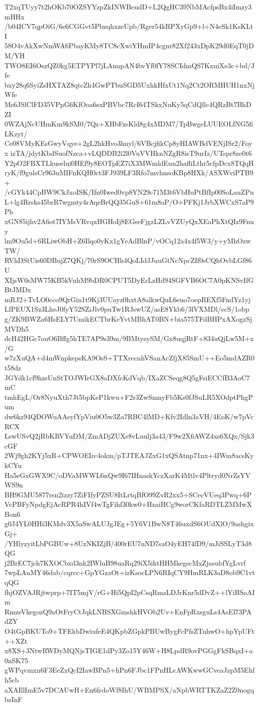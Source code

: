 T2xqTUyy7t2hOKb70OZSYYzpZkINWBeudD+L2QgHC39NbMAcfpsBx4iImzy3mHHx
/b04ICV7qpOiG/6e6CGGvt5PbzqhxzeUpb/Rger54kRPXyGp9+l+N4eSk1KsKLtI
58O4vAkXwNmWA6PbayKMy8TC8cXwiYHmIP4cgnr82Xf243xDpK29d0EqT0jDM/YH
TWO8EI6OszQZ0kg5ETPYPl7jLAnupAN4bvYf0fY78SCIdmQS7KxuiXe3c+bd/Jfe
bxy28q6SyiZsHXTAZ8qtcZh4GwPTbuSGD5UxhkHfxUt1Nq2Ct2ORMHUH1nxNjWfe
Ms6JSlClFD35VPpG6KfOoa6sxPBVbc7RcI64TSkxNuKy5qCdQllc4QRzBt7BhDZI
0WZAjNcUHmKm9kSM0/7Qz+XHbFzsKld8g4xMDM7/TpBwgeLUUEOLfNG5fiLKzyt/
Ce08VMyKEsGwyVqye+2gL2hkHvo3huyl/6VBcjfikCp8yHIAWBdVENjISr2/Foyx
izTA/jdytKbdSuofNzca+vLQDDB2i2l0VuVVHknNZgR8isT9urIz/UTspr8ze0t6
Y2pO2FBXTLkuselui0HEf9y8EOTpEZ7iX3MWmldEun2hafliLthr5cfpDcx8TQqH
ryK/f9gulsCr963uMIFnKQH0ct3FJ939LF3Rfo7mvhnsoKBp8HXk/ASXWviPTB9+
/cGYk44CpBW9CkJxoISK/Ifn0Iwed0vp8YN29c71M3t6VbHuPtBfIp00SoLauZPu
L+lg4Rrsks45brR7wgmty4rAqeBrQQ35GuS+61m8aP/O+PFKj1JrbXWCxS7aP9Ph
xGN85ijhv2A6ot7IYMsVRvqxHGHoIj8EGseFjgzLZLvVZUyQxXEaPhXtQIz9Fnuy
lm9Ou5d+6RLiwObH+Z6Ilqo0yKx1gYeAdBlnP/vOCq12a4x4f5W3/y+yMhOzwTW/
RVhDStUis60DBujZ7QKj/70rS9OCHh4QoLIdJJuuGtNcNpcZIf0sCQhOvbLGf86U
XIjsW0sMW75KB5kVuhM9bDR0CPUT5DyErLzHd94SGFVB6OC7A0pKNSvIfGBtJMDx
mRJ2+TvLO0cco9QrGin1t9Kj3UUayz0hxtA8alkwQuL6euo7oepREXf5FndYz1yj
LfPEUX1Sz3LheJ0fyY52SZiJlv0puTw1RJswUZ/asE8Ykb6/3lVXMDl/ecS/1obp
g/ZK9BWZa6HsELY7UmikECTbrKeYvtMBhAT0BN+bia575TFdBHPxAXogzSjMVDh5
dcH42HGc7ouO6Bffg5hTE7AP9s39m/9BMtysySM/Gx8uqjRtF+834uQjLw5M+x/G
w7zXuQA+d4mWnpkepsKA9OsS+TTXrecnhVSanAcZfjX85SmU++Eo5mdAZR0t58dz
JGYdk1cf9hzsUnStTOJWIrGX8aDXfcKdVqb/IXaZCSeqg8Q5gFsiECCfB3AoC7mC
tmhEgL/Or8NyuXth7Jt5bpKeP1kwu+F2r3ZwSnmyFb5Ks0fJSuLR5XOdptPhgPum
dw6kz94QDOWuAAsyfYpViu0O5w3Za7RBC4lMD+Kfv2Idln3aVH/4EoK/w7pVcRCX
LswUSvQ2jRbKRVYuDM/ZmADjZUXs8vLuulj3a43/F9w2X6AWZ4xs6XQx/Sjk3cGF
2Wj9gh2KYj5xR+CPWOEIrc4okm/pTJTEAJZxG1xQSAtnp71nx+4IWm8acsKykCYu
Ha5eGxGWX9C/oDVaMWWL6nQw9I67IHnaskYczXarK4Mtlv4Pltryd0NrZsYVWS9n
BH9GMU5877rsn2izzy7ZiFIfyPZSU8ItLrtqBfO99ZvR2xx5+SCecVUeq3Pwq+6P
VcPBFyNpdgEjAcRPR4hIVf4wTgFihf30kw0+HzaiHCg9worCKfaRDTLZMMwXBon6
g0J4YL0HHi3KMdv3X5aSwALUJgJEg+5Y6V1BwN8T46uxdS6OUdXlO/9ashgixGj+
/YHlyzyitLbPGBUw+8UzNKIZjB/400rEU7uND7saO4yEH74fD9/mJiSSLyT3d8QG
j2BrEC7jch7KXOCbxd3nk2IWluB98uaRq29iX5iktHHMkegscMxZjasubfYgLvrf
7wpLAnMY46dab/cqrcc+GpYGzaOt+izKsocLPN6RIqCY9HmRLK3aD8ob9C1vtqQG
fhjOZVAJRjtwprp+7IT5mjV/rG+Hi5QpI2pCsqRmzLDJrKnr5dDvZ++lYiBSoAIm
RmzeVkegozQ9aOtFryCtJqkLNBSXGmshkHVOb2Uv+EnFpRxsguLs4AsEl73PAdZY
O4tGpBKUTo9+TFEkbDwiufeE4QKpbZGpkPBUwBygFcPfsZTuhwO+hpYpUFt++XZt
x8XS+3NtwRWDyMQNjsTIGE1dPy3Zo15Y46W+H8LpdR9ovPGGgFkSBqxI+a0nSK75
gWPqvmxn6F3EeZxQcI2IawBPn5+hPn6FJbc1FPnHLcAWKwwGCveaJzpM5Ehfh5cb
aXAIllImE5v7DCAUwH+En6frdoWf8IhU/WBMPSX/aNpbWRTTKZaZ2Z0nogqbzInF
